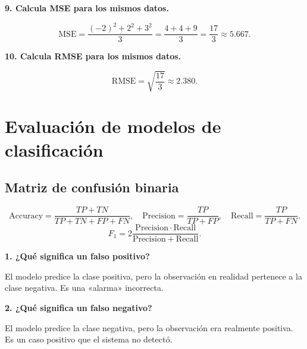 \documentclass[11pt]{article}
\newcommand{\pregunta}[1]{\vspace{2mm}\textbf{#1}}
\begin{document}
\pregunta{9. Calcula MSE para los mismos datos.}
\begin{respuesta}
\[
\mathrm{MSE}=\frac{(-2)^2+2^2+3^2}{3}=\frac{4+4+9}{3}=\frac{17}{3}\approx5.667.
\]
\end{respuesta}

\pregunta{10. Calcula RMSE para los mismos datos.}
\begin{respuesta}
\[
\mathrm{RMSE}=\sqrt{\frac{17}{3}}\approx 2.380.
\]
\end{respuesta}

\section{Evaluación de modelos de clasificación}

\subsection*{Matriz de confusión binaria}
\begin{center}
\end{center}

\[
\mathrm{Accuracy}=\frac{TP+TN}{TP+TN+FP+FN},\quad
\mathrm{Precision}=\frac{TP}{TP+FP},\quad
\mathrm{Recall}=\frac{TP}{TP+FN}.
\]
\[
F_1=2\frac{\mathrm{Precision}\cdot\mathrm{Recall}}{\mathrm{Precision}+\mathrm{Recall}}.
\]

\pregunta{1. ¿Qué significa un falso positivo?}
\begin{respuesta}
El modelo predice la clase positiva, pero la observación en realidad pertenece a la clase negativa. Es una «alarma» incorrecta.
\end{respuesta}

\pregunta{2. ¿Qué significa un falso negativo?}
\begin{respuesta}
El modelo predice la clase negativa, pero la observación era realmente positiva. Es un caso positivo que el sistema no detectó.
\end{respuesta}
\end{document}
